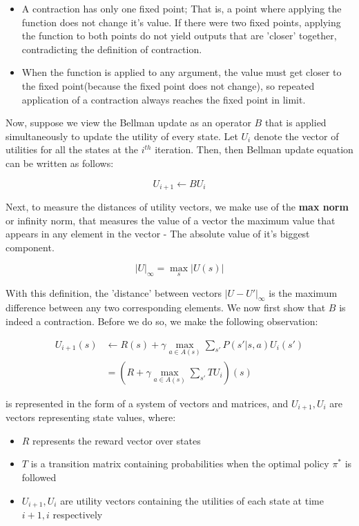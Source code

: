 \documentclass[11pt]{article}
\begin{document}
\begin{itemize}
    \item A contraction has only one fixed point; That is, a point where applying the function does not change it's value. If there were two fixed points, applying the function to both points do not yield outputs that are 'closer' together, contradicting the definition of contraction.
    \item When the function is applied to any argument, the value must get closer to the fixed point(because the fixed point does not change), so repeated application of a contraction always reaches the fixed point in limit.
\end{itemize}

Now, suppose we view the Bellman update as an operator $B$ that is applied simultaneously to update the utility of every state. Let $U_i$ denote the vector of utilities for all the states at the $i^{th}$ iteration. Then, then Bellman update equation can be written as follows:

$$
U_{i+1} \leftarrow BU_i
$$

Next, to measure the distances of utility vectors, we make use of the \textbf{max norm} or infinity norm, that measures the value of a vector the maximum value that appears in any element in the vector - The absolute value of it's biggest component.

$$
|U|_{\infty} = \max_s |U(s)|
$$

With this definition, the 'distance' between vectors $|U - U'|_{\infty}$ is the maximum difference between any two corresponding elements. We now first show that $B$ is indeed a contraction. Before we do so, we make the following observation:

$$
\begin{aligned}
U_{i+1}(s) &\leftarrow R(s) + \gamma \underset{a \in A(s)}{\max} \sum_{s'} P(s' | s, a) U_i(s')\\
&= (R + \gamma \underset{a \in A(s)}{\max}\sum_{s'} TU_{i})(s)
\end{aligned}
$$

is represented in the form of a system of vectors and matrices, and $U_{i+1}, U_i$ are vectors representing state values, where:

\begin{itemize}
    \item $R$ represents the reward vector over states
    \item $T$ is a transition matrix containing probabilities when the optimal policy $\pi^*$ is followed
    \item $U_{i+1}, U_i$ are utility vectors containing the utilities of each state at time $i+1, i$ respectively
\end{itemize}
\end{document}
